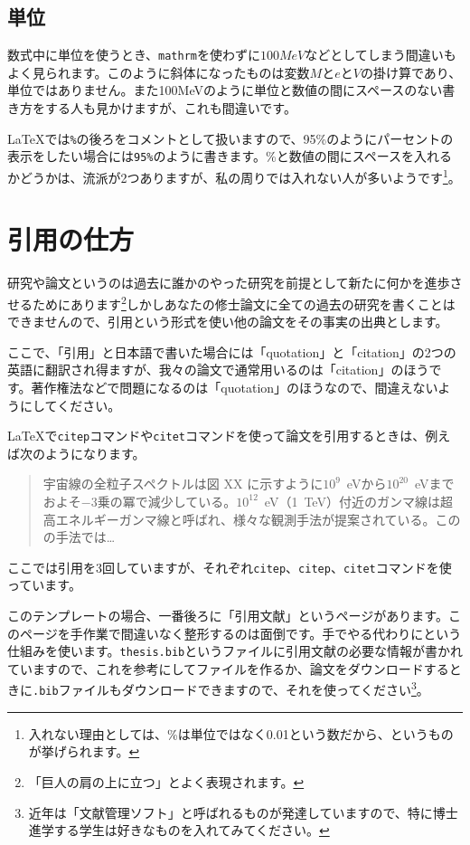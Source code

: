 \subsection{単位}
数式中に単位を使うとき、\texttt{mathrm}を使わずに$100 MeV$などとしてしまう間違いもよく見られます。このように斜体になったものは変数$M$と$e$と$V$の掛け算であり、単位ではありません。また100MeVのように単位と数値の間にスペースのない書き方をする人も見かけますが、これも間違いです。

\LaTeX{}では\texttt{\%}の後ろをコメントとして扱いますので、95\%のようにパーセントの表示をしたい場合には\texttt{95\%}のように書きます。\%と数値の間にスペースを入れるかどうかは、流派が2つありますが、私の周りでは入れない人が多いようです\footnote{入れない理由としては、\%は単位ではなく0.01という数だから、というものが挙げられます。}。

\section{引用の仕方}

研究や論文というのは過去に誰かのやった研究を前提として新たに何かを進歩させるためにあります\footnote{「巨人の肩の上に立つ」とよく表現されます。}しかしあなたの修士論文に全ての過去の研究を書くことはできませんので、引用という形式を使い他の論文をその事実の出典とします。

ここで、「引用」と日本語で書いた場合には「quotation」と「citation」の2つの英語に翻訳され得ますが、我々の論文で通常用いるのは「citation」のほうです。著作権法などで問題になるのは「quotation」のほうなので、間違えないようにしてください。

\LaTeX{}で\texttt{citep}コマンドや\texttt{citet}コマンドを使って論文を引用するときは、例えば次のようになります。

\begin{quote} %
  宇宙線の全粒子スペクトルは図 XX に示すように$10^9$~eVから$10^{20}$~eVまでおよそ$-3$乗の冪で減少している\citep{Swordy2001}。$10^{12}$~eV（1~TeV）付近のガンマ線は超高エネルギーガンマ線と呼ばれ、様々な観測手法が提案されている\citep[例えば][を見よ]{Okumura2005}。この\citet{Okumura2005}の手法では\ldots
\end{quote}
ここでは引用を3回していますが、それぞれ\texttt{citep}、\texttt{citep}、\texttt{citet}コマンドを使っています。

このテンプレートの場合、一番後ろに「引用文献」というページがあります。このページを手作業で間違いなく整形するのは面倒です。手でやる代わりに\BibTeX{}という仕組みを使います。\texttt{thesis.bib}というファイルに引用文献の必要な情報が書かれていますので、これを参考にして\BibTeX{}ファイルを作るか、論文をダウンロードするときに\texttt{.bib}ファイルもダウンロードできますので、それを使ってください\footnote{近年は「文献管理ソフト」と呼ばれるものが発達していますので、特に博士進学する学生は好きなものを入れてみてください。}。
